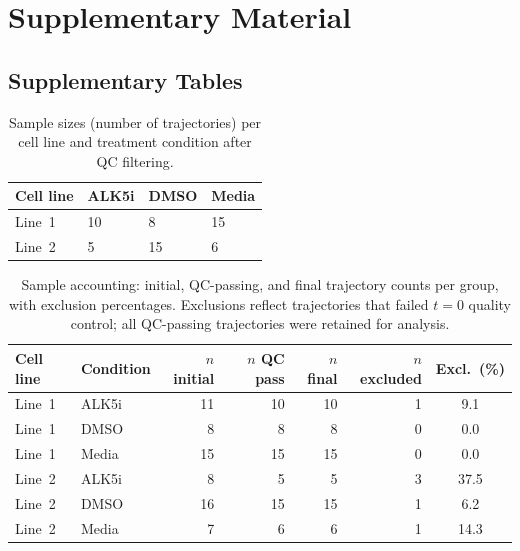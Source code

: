 \clearpage
\appendix
\setcounter{table}{0}
\renewcommand{\thetable}{S\arabic{table}}
\setcounter{figure}{0}
\renewcommand{\thefigure}{S\arabic{figure}}

\section*{Supplementary Material}

\subsection*{Supplementary Tables}

\begin{table}[H]
\centering
\caption{Sample sizes (number of trajectories) per cell line and treatment condition
  after QC filtering.}
\label{tab:supp-sample-sizes}
\begin{tabular}{llll}
\toprule
Cell line & ALK5i & DMSO & Media \\
\midrule
Line~1 & 10 & 8  & 15 \\
Line~2 &  5 & 15 &  6 \\
\bottomrule
\end{tabular}
\end{table}

\begin{table}[H]
\centering
\caption{Sample accounting: initial, QC-passing, and final trajectory counts per group,
  with exclusion percentages.
  Exclusions reflect trajectories that failed $t = 0$ quality control; all
  QC-passing trajectories were retained for analysis.}
\label{tab:supp-sample-accounting}
\begin{tabular}{llrrrr
  S[table-format=2.1]}
\toprule
{Cell line} & {Condition} & {$n$ initial} & {$n$ QC pass} & {$n$ final} & {$n$ excluded} & {Excl.\ (\%)} \\
\midrule
Line~1 & ALK5i &  11 & 10 & 10 & 1 &  9.1 \\
Line~1 & DMSO  &   8 &  8 &  8 & 0 &  0.0 \\
Line~1 & Media &  15 & 15 & 15 & 0 &  0.0 \\
Line~2 & ALK5i &   8 &  5 &  5 & 3 & 37.5 \\
Line~2 & DMSO  &  16 & 15 & 15 & 1 &  6.2 \\
Line~2 & Media &   7 &  6 &  6 & 1 & 14.3 \\
\bottomrule
\end{tabular}
\end{table}


